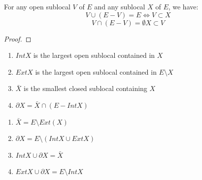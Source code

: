 \begin{lemma}
    \label{lem:properties_of_complements_part_2}
    \leanok
    For any open sublocal $V$ of $E$ and any sublocal $X$ of $E$, we have:
    \[V \cup (E - V) = E \iff V \subset X \]
    \[V \cap (E - V) = \emptyset X \subset V\]
\end{lemma}
\begin{proof}
    \leanok
\end{proof}

\begin{definition}
    \label{def:further_topology}
    \leanok
    \begin{enumerate}
        \item $Int X$ is the largest open sublocal contained in $X$
        \item $Ext X$ is the largest open sublocal contained in $E \setminus X$
        \item $\bar{X}$ is the smallest closed sublocal containing $X$
        \item $\partial X = \bar{X} \cap (E - Int X)$
    \end{enumerate}
\end{definition}

\begin{lemma} 
    \label{lem:properties_of_further_topology}
    \leanok
    \begin{enumerate}
        \item $\bar{X} = E \setminus Ext(X)$
        \item $\partial X = E \setminus (Int X \cup Ext X)$
        \item $Int X \cup \partial X = \bar X$
        \item $Ext X \cup \partial X = E \setminus Int X$
    \end{enumerate}
\end{lemma}


